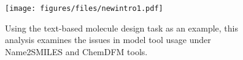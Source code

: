 \begin{figure}[t] 
    \centering
        \texttt{[image: figures/files/newintro1.pdf]}
    \caption{
    Using the text-based molecule design task as an example, this analysis examines the issues in model tool usage under Name2SMILES and ChemDFM tools.}
    \label{fig:intro}
\end{figure}
